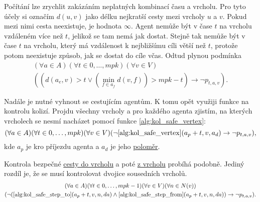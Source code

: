 Počítání lze zrychlit zakázáním neplatných kombinací času a vrcholu.
Pro tyto účely si označím $d(u, v)$ jako délku nejkratší cesty mezi vrcholy $u$ a $v$.
Pokud mezi nimi cesta neexistuje, je hodnota $\infty$.
Agent nemůže být v čase $t$ na vrcholu vzdáleném více než $t$, jelikož se tam nemá jak dostat.
Stejně tak nemůže být v čase $t$ na vrcholu, který má vzdálenost k nejbližšímu cíli větší než $t$,
protože potom neexistuje způsob, jak se dostat do cíle včas.
Odtud plynou podmínka
\begin{gather*}
(\forall a \in A)(\forall t \in {0, \dots, mpk})(\forall v \in V)
	\\
	((d(a_e, v) > t \vee (\min_{f \in a_f} d(v, f)) > mpk - t) \rightarrow \neg p_{t, a, v}).
\end{gather*}

Nadále je nutné vyhnout se cestujícím agentům.
K tomu opět využiji funkce na kontrolu kolizí.
Projdu všechny vrcholy a pro každého agenta zjistím,
na kterých vrcholech se nesmí nacházet pomocí funkce \ref{alg:kol_safe_vertex}:
\[
	(\forall a \in A)(\forall t \in {0, \dots, mpk})(\forall v \in V)
	(\neg \ref{alg:kol_safe_vertex}(a_p + t, v, a_d) \rightarrow \neg p_{t, a, v}),
\]
kde $a_p$ je kro příjezdu agenta a $a_d$ je jeho \hyperref[par:polomer_agenta]{poloměr}.

Kontrola bezpečné \hyperref[subsec:cesta_do_vrcholu]{cesty do vrcholu}
a poté \hyperref[subsec:cesta_z_vrcholu]{z vrcholu} probíhá podobně.
Jediný rozdíl je, že se musí kontrolovat dvojice sousedních vrcholů.
\begin{gather*}
(\forall a \in A)(\forall t \in {0, \dots, mpk - 1})(\forall v \in V)
	(\forall n \in N(v)) \\
	(\neg(\ref{alg:kol_safe_step_to}(a_p + t, v, n, da) \wedge \ref{alg:kol_safe_step_from}(a_p + t, v, n, da))
	\rightarrow \neg p_{t, a, v}).
\end{gather*}

